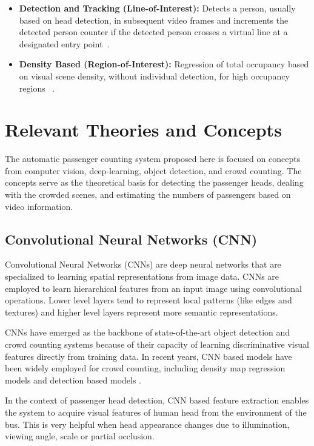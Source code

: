 \begin{itemize}
    \item \textbf{Detection and Tracking (Line-of-Interest):} Detects a person, usually based on head detection, in subsequent video frames and increments the detected person counter if the detected person crosses a virtual line at a designated entry point~\cite{kim2022development, calle2022automatic}.

    \item \textbf{Density Based (Region-of-Interest):} Regression of total occupancy based on visual scene density, without individual detection, for high occupancy regions ~\cite{gouiaa2021advances}.
\end{itemize}

\section{Relevant Theories and Concepts}
\label{sec:relevant-theories}

The automatic passenger counting system proposed here is focused on concepts from computer vision, deep-learning, object detection, and crowd counting. The concepts serve as the theoretical basis for detecting the passenger heads, dealing with the crowded scenes, and estimating the numbers of passengers based on video information.

\subsection{Convolutional Neural Networks (CNN)}

Convolutional Neural Networks (CNNs) are deep neural networks that are specialized to learning spatial representations from image data. CNNs are employed to learn hierarchical features from an input image using convolutional operations. Lower level layers tend to represent local patterns (like edges and textures) and higher level layers represent more semantic representations.

CNNs have emerged as the backbone of state-of-the-art object detection and crowd counting systems because of their capacity of learning discriminative visual features directly from training data. In recent years, CNN based models have been widely employed for crowd counting, including density map regression models and detection based models \cite{fan2022survey}.

In the context of passenger head detection, CNN based feature extraction enables the system to acquire visual features of human head from the environment of the bus. This is very helpful when head appearance changes due to illumination, viewing angle, scale or partial occlusion.

